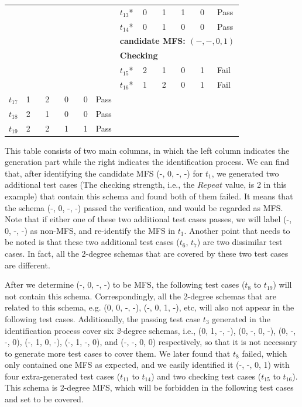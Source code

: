 \documentclass[10pt,journal,compsoc]{IEEEtran}
\begin{document}
\begin{table}[ht]
\begin{tabular}{llllll|llllll}
\multicolumn{5}{l}{}& &$t_{13}$* &\multicolumn{4}{l}{0  \ \ \  1 \ \ \  1 \ \ \  0} & Pass \\
\multicolumn{5}{l}{}& &$t_{14}$* &\multicolumn{4}{l}{0  \ \ \  1 \ \ \  0 \ \ \  0} & Pass \\
\multicolumn{5}{l}{}& &\multicolumn{6}{l}{ \bfseries{candidate MFS}: $(-, -, 0, 1)$ }  \\
\multicolumn{5}{l}{}& &\multicolumn{6}{l}{ \bfseries{\textbf{Checking}} }  \\
\multicolumn{5}{l}{}& & $t_{15}$* &\multicolumn{4}{l}{2  \ \ \  1 \ \ \  0 \ \ \  1 }& Fail \\
\multicolumn{5}{l}{}& & $t_{16}$* &\multicolumn{4}{l}{1  \ \ \  2 \ \ \  0 \ \ \  1 }& Fail \\
$t_{17}$ &\multicolumn{4}{l}{1  \ \ \  2 \ \ \ 0 \ \ \ 0 } & Pass & \multicolumn{6}{l}{}\\
$t_{18}$ &\multicolumn{4}{l}{2  \ \ \   1 \ \ \ 0  \ \ \  0 } & Pass & \multicolumn{6}{l}{}\\
$t_{19}$ &\multicolumn{4}{l}{2  \ \ \   2 \ \ \ 1  \ \ \  1 } & Pass & \multicolumn{6}{l}{}\\
\hline
\end{tabular}
\end{table}

This table consists of two main columns, in which the left column indicates the generation part while the right indicates the identification process. We can find that, after identifying the candidate MFS (-, 0, -, -) for $t_{1}$, we generated two additional test cases (The checking strength, i.e., the $Repeat$ value, is 2 in this example) that contain this schema and found both of them failed. It means that the schema (-, 0, -, -) passed the verification, and would be regarded as MFS. Note that if either one of these two additional test cases passes, we will label (-, 0, -, -) as non-MFS, and re-identify the MFS in $t_{1}$.  Another point that needs to be noted is that these two additional test cases ($t_{6}$, $t_{7}$) are two dissimilar test cases. In fact, all the 2-degree schemas that are covered by these two test cases are different.


After we determine (-, 0, -, -) to be MFS, the following test cases ($t_{8}$ to $t_{19}$) will not contain this schema. Correspondingly, all the 2-degree schemas that are related to this schema, e.g. (0, 0, -, -), (-, 0, 1, -), etc, will also not appear in the following test cases. Additionally, the passing test case $t_{3}$ generated in the identification process cover six \emph{2}-degree schemas, i.e., (0, 1, -, -), (0, -, 0, -), (0, -, -, 0), (-, 1, 0, -), (-, 1, -, 0), and (-, -, 0, 0) respectively, so that it is not necessary to generate more test cases to cover them. We later found that $t_{8}$ failed, which only contained one MFS as expected, and we easily identified it (-, -, 0, 1) with four extra-generated test cases ($t_{11}$ to $t_{14}$) and two checking test cases ($t_{15}$ to $t_{16}$). This schema is 2-degree MFS, which will be forbidden in the following test cases and set to be covered.
\end{document}
